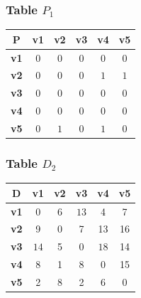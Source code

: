 \documentclass{beamer}
\begin{document}
\begin{frame}
\frametitle{Table $P_{1}$}
\begin{center}
    \begin{tabular}{|c||c|c|c|c|c|}
        \hline
        \textbf{P} & \textbf{v1} & \textbf{v2} & \textbf{v3} & \textbf{v4} & \textbf{v5} \\
        \hline
        \hline
        \textbf{v1}& 0 & 0 & 0 & 0 & 0 \\
        \hline
        \textbf{v2}& 0 & 0 & 0 & \cellcolor[HTML]{D74894}$1$ & \cellcolor[HTML]{D74894}$1$ \\
        \hline
        \textbf{v3}& 0 & 0 & 0 & 0 & 0 \\
        \hline
        \textbf{v4}& 0 & 0 & 0 & 0 & 0 \\
        \hline
        \textbf{v5}& 0 & \cellcolor[HTML]{D74894}$1$ & 0 & \cellcolor[HTML]{D74894}$1$ & 0 \\
        \hline
    \end{tabular}
\end{center}


\end{frame}





\begin{frame}
\frametitle{Table $D_{2}$}
\begin{center}
    \begin{tabular}{|c||c|c|c|c|c|}
        \hline
        \textbf{D} & \textbf{v1} & \textbf{v2} & \textbf{v3} & \textbf{v4} & \textbf{v5} \\
        \hline
        \hline
        \textbf{v1}& 0 & 6 & \cellcolor[HTML]{D74894}$13$ & 4 & 7 \\
        \hline
        \textbf{v2}& 9 & 0 & 7 & 13 & 16 \\
        \hline
        \textbf{v3}& \cellcolor[HTML]{D74894}$14$ & 5 & 0 & \cellcolor[HTML]{D74894}$18$ & 14 \\
        \hline
        \textbf{v4}& 8 & 1 & \cellcolor[HTML]{D74894}$8$ & 0 & 15 \\
        \hline
        \textbf{v5}& 2 & 8 & 2 & 6 & 0 \\
        \hline
    \end{tabular}
\end{center}


\end{frame}
\end{document}
